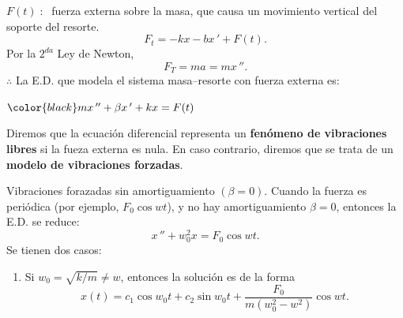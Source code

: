 \documentclass{beamer}
\begin{document}
\begin{frame}[t]
\begin{block}{}
\begin{minipage}{0.3\linewidth}
		\end{minipage}\hspace{5mm}
		\begin{minipage}{0.6\linewidth}
			\(F(t) \;:\;\) fuerza externa sobre la masa, que causa un movimiento vertical del soporte del resorte.
			\[
				F_t = -kx -bx\,' +F(t).
			\]
			Por la \(2^{da}\) Ley de Newton,
			\[
				F_T = ma  =mx\,''.
			\]
			\(\therefore\) La E.D. que modela el sistema masa--resorte con fuerza externa es:
		\begin{center}
			\color{red} \underline{\(\color{black} mx\,'' + \beta x\,' +kx = F(t)\)}
		\end{center}
		\end{minipage}
	\end{block}
\end{frame}

\begin{frame}[t]
	\begin{block}{}
		Diremos que la ecuación diferencial representa un \textbf{fenómeno de vibraciones libres} si la fueza externa es nula. En caso contrario, diremos que se trata de un \textbf{modelo de vibraciones forzadas}.
	\end{block}
	\begin{block}{Vibraciones forazadas sin amortiguamiento \((\beta =0)\).}
		Cuando la fuerza es periódica (por ejemplo, \(F_0 \cos wt\)), y no  hay amortiguamiento \(\beta =0\), entonces la E.D. se reduce:
		\[
			x\,'' + w_0^2x = F_0 \cos wt.
		\]
		Se tienen dos casos:
		\begin{enumerate}
			\item Si \(w_0= \sqrt{k/m} \ne w\), entonces la solución es de la forma
				\[
					x(t) = c_1 \cos w_0t + c_2 \sin w_0t + \dfrac{F_0}{m(w_0^2- w^2)} \cos wt.
				\]
		\end{enumerate}
	\end{block}
\end{frame}
\end{document}
